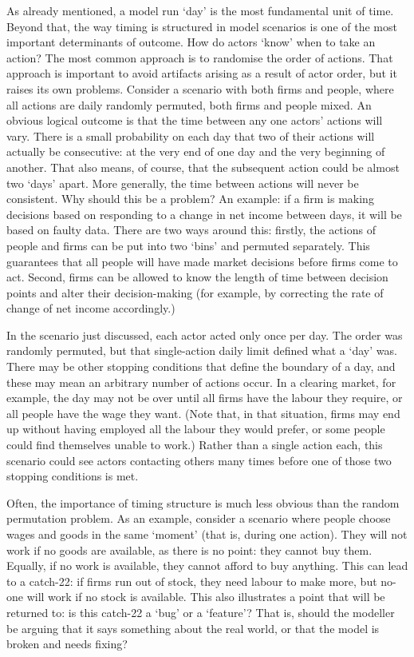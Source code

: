 As already mentioned, a model run `day' is the most fundamental unit of time. Beyond that, the way timing is structured in model scenarios is one of the most important determinants of outcome. How do actors `know' when to take an action? The most common approach  is to randomise the order of actions. That approach is important to avoid artifacts arising as a result of actor order, but it raises its own problems. Consider a scenario with both firms and people, where all actions are daily randomly permuted, both firms and people mixed. An obvious logical outcome is that the time between any one actors' actions will vary. There is a small probability on each day that two of their actions will actually be consecutive: at the very end of one day and the very beginning of another. That also means, of course, that the subsequent action could be almost two `days' apart. More generally, the time between actions will never be consistent. Why should this be a problem? An example: if a firm is making decisions based on responding to a change in net income between days, it will be based on faulty data. There are two ways around this: firstly, the actions of people and firms can be put into two `bins' and permuted separately. This guarantees that all people will have made market decisions before firms come to act. Second, firms can be allowed to know the length of time between decision points and alter their decision-making (for example, by correcting the rate of change of net income accordingly.)

In the scenario just discussed, each actor acted only once per day. The order was randomly permuted, but that single-action daily limit defined what a `day' was. There may be other stopping conditions that define the boundary of a day, and these may mean an arbitrary number of actions occur. In a clearing market, for example, the day may not be over until all firms have the labour they require, or all people have the wage they want. (Note that, in that situation, firms may end up without having employed all the labour they would prefer, or some people could find themselves unable to work.) Rather than a single action each, this scenario could see actors contacting others many times before one of those two stopping conditions is met.

Often, the importance of timing structure is much less obvious than the random permutation problem. As an example, consider a scenario where people choose wages and goods in the same `moment' (that is, during one action). They will not work if no goods are available, as there is no point: they cannot buy them. Equally, if no work is available, they cannot afford to buy anything. This can lead to a catch-22: if firms run out of stock, they need labour to make more, but no-one will work if no stock is available. This also illustrates a point that will be returned to: is this catch-22 a `bug' or a `feature'? That is, should the modeller be arguing that it says something about the real world, or that the model is broken and needs fixing?

